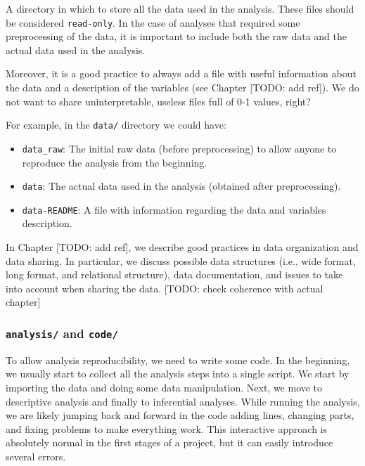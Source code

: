 \documentclass[
  11pt,
]{book}
\providecommand{\tightlist}{%
  \setlength{\itemsep}{0pt}\setlength{\parskip}{0pt}}
\begin{document}
A directory in which to store all the data used in the analysis. These files should be considered \texttt{read-only}. In the case of analyses that required some preprocessing of the data, it is important to include both the raw data and the actual data used in the analysis.

Moreover, it is a good practice to always add a file with useful information about the data and a description of the variables (see Chapter {[}TODO: add ref{]}). We do not want to share uninterpretable, useless files full of 0-1 values, right?

For example, in the \texttt{data/} directory we could have:

\begin{itemize}
\tightlist
\item
  \texttt{data\_raw}: The initial raw data (before preprocessing) to allow anyone to reproduce the analysis from the beginning.
\item
  \texttt{data}: The actual data used in the analysis (obtained after preprocessing).
\item
  \texttt{data-README}: A file with information regarding the data and variables description.
\end{itemize}

In Chapter {[}TODO: add ref{]}, we describe good practices in data organization and data sharing. In particular, we discuss possible data structures (i.e., wide format, long format, and relational structure), data documentation, and issues to take into account when sharing the data. {[}TODO: check coherence with actual chapter{]}

\hypertarget{analysis-code}{%
\subsubsection{\texorpdfstring{\texttt{analysis/} and \texttt{code/}}{analysis/ and code/}}\label{analysis-code}}

To allow analysis reproducibility, we need to write some code. In the beginning, we usually start to collect all the analysis steps into a single script. We start by importing the data and doing some data manipulation. Next, we move to descriptive analysis and finally to inferential analyses. While running the analysis, we are likely jumping back and forward in the code adding lines, changing parts, and fixing problems to make everything work. This interactive approach is absolutely normal in the first stages of a project, but it can easily introduce several errors.
\end{document}
